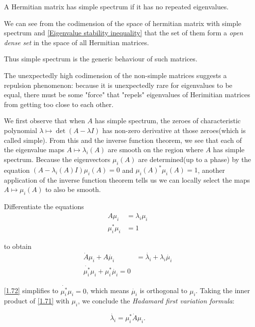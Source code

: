 \begin{definition}
    A Hermitian matrix has simple spectrum if it has no repeated eigenvalues.
\end{definition}

We can see from the codimension of the space of hermitian matrix with simple spectrum and \ref{Eigenvalue stability inequality} that the set of them form a \textit{open dense set} in the space of all Hermitian matrices.

Thus simple spectrum is the generic behaviour of such matrices.

The unexpectedly high codimension of the non-simple matrices suggests a repulsion phenomenon:
because it is unexpectedly rare for eigenvalues to be equal, there must be some "force" that "repels" eigenvalues of Herimitian matrices from getting too close to each other.

We first observe that when $A$ has simple spectrum, the zeroes of characteristic polynomial $\lambda \mapsto \det(A-\lambda I )$ has non-zero derivative at those zeroes(which is called simple). 
From this and the inverse function theorem, we see that each of the eigenvalue maps $A\mapsto \lambda_i(A)$ are smooth on the region where $A$ has simple spectrum. 
Because the eigenvectors $\mu_i(A)$ are determined(up to a phase) by the equation $(A-\lambda_i(A)I)\mu_i(A)=0$ and $\mu_i(A)^*\mu_i(A)=1$, another application of the inverse function theorem tells us we can locally select the maps $A\mapsto \mu_i(A)$ to also be smooth.

Differentiate the equations 
\begin{eqnarray}
    A\mu_i &= \lambda_i \mu_i \\
    \mu_i^* \mu_i & =1
\end{eqnarray}

to obtain 
\begin{eqnarray}
\dot{A} \mu_i+A \dot{\mu_i} &= \dot{\lambda_i} +\lambda_i \dot{\mu_i} \label{1.71}\\
\dot{\mu_i^*}\mu_i +\mu_i^* \dot{\mu_i} = 0 \label{1.72}
\end{eqnarray}

\ref{1.72} simplifies to $\dot{\mu_i^*} \mu_i =0$, which means $\dot{\mu_i}$ is orthogonal to $\mu_i$. Taking the inner product of \ref{1.71} with $\mu_i$, we conclude the \textit{Hadamard first variation formula}:

\begin{proposition}
    \begin{equation}
        \dot{\lambda_i} = \mu_i^* \dot{A} \mu_i.
    \end{equation}
\end{proposition}


